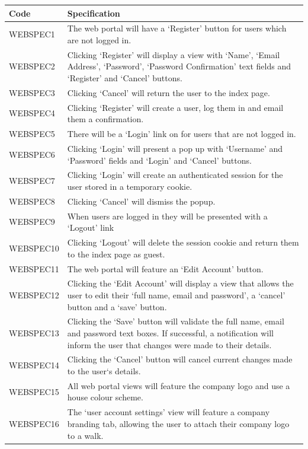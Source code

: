 \documentclass[11pt,a4paper]{article}
\begin{document}
\begin{longtable}{|p{2.5cm}p{13cm}|}
\hline
\textbf{Code} & \textbf{Specification} \\

\hline
WEBSPEC1 & The web portal will have a `Register' button for users which are not logged in. \\ \hline
WEBSPEC2 & Clicking `Register' will display a view with `Name', `Email Address', `Password', `Password Confirmation' text fields and `Register' and `Cancel' buttons.\\ \hline
WEBSPEC3 & Clicking `Cancel' will return the user to the index page.\\ \hline
WEBSPEC4 & Clicking `Register' will create a user, log them in and email them a confirmation. \\ \hline
WEBSPEC5 & There will be a `Login' link on for users that are not logged in.\\ \hline
WEBSPEC6 & Clicking `Login' will present a pop up with `Username' and `Password' fields and `Login' and `Cancel' buttons. \\ \hline
WEBSPEC7 & Clicking `Login' will create an authenticated session for the user stored in a temporary cookie.\\ \hline
WEBSPEC8 & Clicking `Cancel' will dismiss the popup. \\ \hline
WEBSPEC9 & When users are logged in they will be presented with a `Logout' link\\ \hline
WEBSPEC10 & Clicking `Logout' will delete the session cookie and return them to the index page as guest. \\ \hline
WEBSPEC11 & The web portal will feature an `Edit Account' button. \\ \hline
WEBSPEC12 & Clicking the `Edit Account' will display a view that allows the user to edit their `full name, email and password', a `cancel' button and a `save' button. \\ \hline
WEBSPEC13 & Clicking the `Save' button will validate the full name, email and password text boxes. If successful, a notification will inform the user that changes were made to their details. \\ \hline
WEBSPEC14 & Clicking the `Cancel' button will cancel current changes made to the user`s details. \\ \hline
WEBSPEC15 & All web portal views will feature the company logo and use a house colour scheme. \\ \hline
WEBSPEC16 & The `user account settings' view will feature a company branding tab, allowing the user to attach their company logo to a walk. \\ \hline

\end{longtable}
\end{document}
